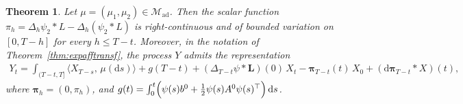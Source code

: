 \documentclass[10pt,a4paper,reqno]{amsart}
\theoremstyle{plain}
\newtheorem{theorem}{Theorem}[section]
\theoremstyle{definition}
\theoremstyle{remark}
\theoremstyle{example}
\begin{document}
\begin{theorem}\label{thm:Yexpress}
 Let $\mu = (\mu_1, \mu_2) \in\mathcal{M}_{\mathrm{ad}}$. Then the scalar function $\pi_h = \Delta_h \psi_2 \ast L - \Delta_h(\psi_2 \ast L)$ is right-continuous and of bounded variation on $[0,T-h]$ for every $h\leq T-t$. Moreover, in the notation of Theorem~\ref{thm:expafftransf}, the process $Y$ admits the representation
\begin{align}\label{eq:Y-representation}
        Y_t = \int_{(T-t,T]} \langle X_{T-s}, \,\mu(\mathrm{d}s)\rangle + g(T-t) 
          + (\Delta_{T-t}\psi\ast \bm{L})(0)\,X_t 
          - \bm{\pi}_{T-t}(t)\,X_0 
          + (\mathrm{d}\bm{\pi}_{T-t}\ast X)(t),
\end{align}
where $\bm{\pi}_h = (0, \pi_h)$, and $g(t) = \int_0^t \Bigl(\psi(s)b^0 + \tfrac{1}{2}\psi(s)A^0\psi(s)^\top\Bigr)\,\mathrm{d}s$.
\end{theorem}
\end{document}
